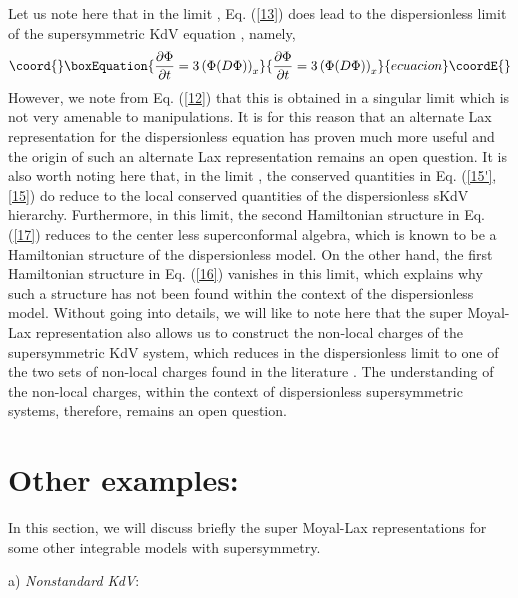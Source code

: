 \documentclass[a4paper,11pt]{article}
\begin{document}
Let us note here that in the limit \coordHE{},
Eq. (\ref{13}) does lead to the dispersionless limit of the \coordHE{}
supersymmetric KdV equation \cite{16}, namely,
\begin{equation}\coord{}\boxEquation{
{\partial \Phi\over \partial t} = 3 \left(\Phi(D\Phi)\right)_{x}
}{
{\partial \Phi\over \partial t} = 3 \left(\Phi(D\Phi)\right)_{x}
}{ecuacion}\coordE{}\end{equation}
However, we note from Eq. (\ref{12}) that this is obtained in a
singular limit which is not very amenable to manipulations. It is for
this reason that an alternate Lax representation for the
dispersionless equation has proven much more useful \cite{16} and the origin of
such an alternate Lax representation remains an open question. It is
also worth noting here that, in the limit \coordHE{}, the
conserved quantities in Eq. (\ref{15'},\ref{15}) do reduce to the
local conserved quantities of the dispersionless sKdV
hierarchy. Furthermore, in this limit, the second Hamiltonian
structure in Eq. (\ref{17}) reduces to the center less superconformal
algebra, which is known to be a Hamiltonian structure of the
dispersionless model. On the other hand, the first Hamiltonian
structure in Eq. (\ref{16}) vanishes in this limit, which explains why
such a structure has not been found within the context of the
dispersionless model. Without going into details, we will like to note
here that the super Moyal-Lax representation also allows us to
construct the non-local charges of the \coordHE{} supersymmetric KdV
system, which reduces in the dispersionless limit to one of the two
sets of non-local charges found in the literature \cite{16}. The
understanding of the non-local charges, within the context of
dispersionless supersymmetric  systems, therefore, remains an open
question. 

\section{Other examples:}

In this section, we will discuss briefly the super Moyal-Lax
representations for some other integrable models with \coordHE{}
supersymmetry. 

a) {\it Nonstandard KdV}:
\medskip
\end{document}
